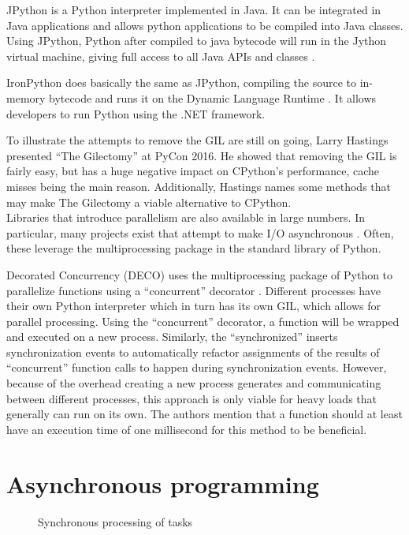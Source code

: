 JPython is a Python interpreter implemented in Java. It can be integrated in Java applications and allows python applications to be compiled into Java classes.
Using JPython, Python after compiled to java bytecode will run in the Jython virtual machine, giving full access to all Java APIs and classes \cite{jython2016why}.

IronPython does basically the same as JPython, compiling the source to in-memory bytecode and runs it on the Dynamic Language Runtime \cite{ironpython2014}.
It allows developers to run Python using the .NET framework.

To illustrate the attempts to remove the GIL are still on going, Larry Hastings presented \enquote{The Gilectomy} at PyCon 2016.
He showed that removing the GIL is fairly easy, but has a huge negative impact on CPython's performance, cache misses being the main reason.
Additionally, Hastings names some methods that may make The Gilectomy a viable alternative to CPython.\\

Libraries that introduce parallelism are also available in large numbers.
In particular, many projects exist that attempt to make I/O asynchronous \cite{asyncio2016python}.
Often, these leverage the multiprocessing package in the standard library of Python.

Decorated Concurrency (DECO) uses the multiprocessing package of Python to parallelize functions using a \enquote{concurrent} decorator \cite{sherman2016deco}.
Different processes have their own Python interpreter which in turn has its own GIL, which allows for parallel processing.
Using the \enquote{concurrent} decorator, a function will be wrapped and executed on a new process.
Similarly, the \enquote{synchronized}  inserts synchronization events to automatically refactor assignments of the results of \enquote{concurrent} function calls to happen during synchronization events.
However, because of the overhead creating a new process generates and communicating between different processes, this approach is only viable for heavy loads that generally can run on its own.
The authors mention that a function should at least have an execution time of one millisecond for this method to be beneficial.

\section{Asynchronous programming}

\begin{figure}[!h]
	\caption{Synchronous processing of tasks}
	\label{fig:normal_execution_flow}
\end{figure}

